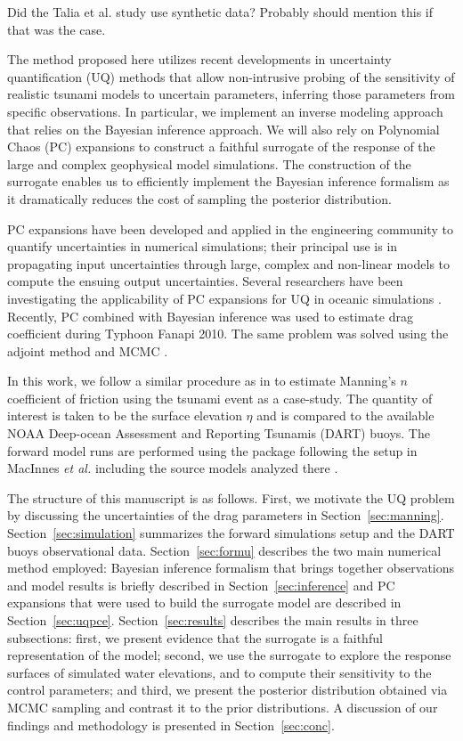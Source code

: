 \alert{Did the Talia et al. study use synthetic data?  Probably should mention
this if that was the case.}

The method proposed here utilizes recent developments in uncertainty
quantification (UQ) methods that allow non-intrusive probing of the sensitivity
of realistic tsunami  models to uncertain parameters, inferring those parameters
from specific  observations.  In particular, we implement an inverse modeling
approach that relies on the Bayesian inference approach.  We will also rely on
Polynomial Chaos (PC) expansions to construct a faithful surrogate of the
response of the large and complex geophysical model simulations.  The
construction of the surrogate enables us to efficiently implement the Bayesian
inference formalism as it dramatically reduces the cost of sampling the
posterior distribution.

PC expansions have been developed and applied in the engineering community to
quantify uncertainties in numerical simulations; their principal use is in
propagating input uncertainties through large, complex and non-linear models to
compute the ensuing output uncertainties. Several researchers have been
investigating the applicability of PC expansions for UQ in oceanic simulations
\citep{thacker2012,ashwanth2010,Alexanderian2012}. Recently, PC combined with
Bayesian inference was used to estimate drag coefficient during Typhoon Fanapi
2010. The same problem was solved using the adjoint method and MCMC
\cite{sraj:2013a,sraj:2013b}.

In this work, we follow a similar procedure as in \cite{sraj:2013a,sraj:2013b}
to estimate Manning's $n$ coefficient of friction using the \tohoku tsunami
event as a case-study.  The quantity of interest is taken to be the surface
elevation $\eta$ and is compared to the available NOAA Deep-ocean Assessment and
Reporting Tsunamis (DART) buoys.  The forward model runs are performed using the
\geoclaw package following the setup in MacInnes \emph{et al.} including the
source models analyzed there \cite{MacInnes:2013cr}.

The structure of this manuscript is as follows. First, we motivate the UQ problem 
by discussing the uncertainties of the drag parameters in Section~\ref{sec:manning}. 
Section~\ref{sec:simulation} summarizes the forward simulations setup
and the DART buoys observational data. 
Section~\ref{sec:formu} describes the two main numerical method employed:
Bayesian inference formalism that brings together observations 
and model results is briefly described in Section~\ref{sec:inference} 
and PC expansions that were used to build the surrogate model are described
in Section~\ref{sec:uqpce}. Section~\ref{sec:results} describes the main results in 
three subsections: first, we present evidence that the surrogate is a faithful 
representation of the \geoclaw model; second, we use the surrogate to explore the 
response surfaces of simulated water elevations, and to compute their sensitivity 
to the control parameters; and third, we present the posterior distribution obtained 
via MCMC sampling and contrast it to the prior distributions. 
A discussion of our findings and methodology is presented in Section~\ref{sec:conc}.